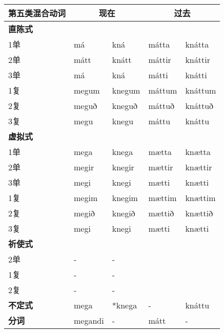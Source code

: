 \begin{longtable}{lllll}
    \toprule
    第五类混合动词  & \multicolumn{2}{c}{现在} & \multicolumn{2}{c}{过去}                    \\
    \midrule
    \endhead
    \bottomrule
    \endfoot
    \textbf{直陈式} & ~                        & ~                        & ~      & ~       \\
    1单             & má                       & kná                      & mátta  & knátta  \\
    2单             & mátt                     & knátt                    & máttir & knáttir \\
    3单             & má                       & kná                      & mátti  & knátti  \\
    1复             & megum                    & knegum                   & máttum & knáttum \\
    2复             & meguð                    & kneguð                   & máttuð & knáttuð \\
    3复             & megu                     & knegu                    & máttu  & knáttu  \\
    \textbf{虚拟式} & ~                        & ~                        & ~      & ~       \\
    1单             & mega                     & knega                    & mætta  & knætta  \\
    2单             & megir                    & knegir                   & mættir & knættir \\
    3单             & megi                     & knegi                    & mætti  & knætti  \\
    1复             & megim                    & knegim                   & mættim & knættim \\
    2复             & megið                    & knegið                   & mættið & knættið \\
    3复             & megi                     & knegi                    & mætti  & knætti  \\
    \textbf{祈使式} & ~                        & ~                        & ~      & ~       \\
    2单             & -                        & -                        & ~      & ~       \\
    1复             & -                        & -                        & ~      & ~       \\
    2复             & -                        & -                        & ~      & ~       \\
    \textbf{不定式} & mega                     & *knega                   & -      & knáttu  \\
    \textbf{分词}   & megandi                  & -                        & mátt   & -       \\
\end{longtable}

